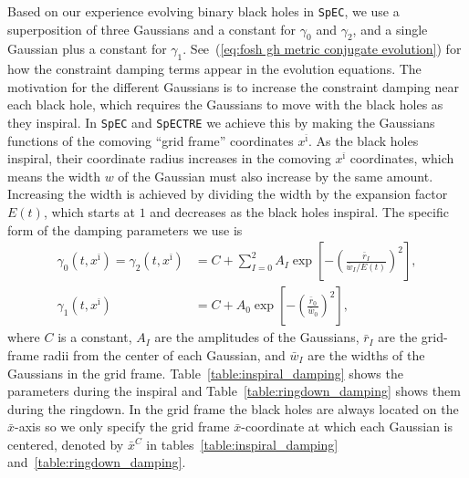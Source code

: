 \begin{bibunit}[unsrtnat]
Based on our experience evolving binary black holes in \texttt{SpEC}, we use a
superposition of three Gaussians and a constant for $\gamma_0$ and $\gamma_2$,
and a single Gaussian plus a constant for $\gamma_1$. See~(\ref{eq:fosh gh
  metric conjugate evolution}) for how the constraint damping terms appear in the
evolution equations. The motivation for the different Gaussians is to increase
the constraint damping near each black hole, which requires the Gaussians to
move with the black holes as they inspiral. In \texttt{SpEC} and
\texttt{SpECTRE} we achieve this by making the Gaussians functions of the
comoving ``grid frame'' coordinates $x^{\bar{\imath}}$. As the black holes
inspiral, their coordinate radius increases in the comoving $x^{\bar{\imath}}$
coordinates, which means the width $w$ of the Gaussian must also increase by the
same amount. Increasing the width is achieved by dividing the width by the
expansion factor $E(t)$, which starts at $1$ and decreases as the black holes
inspiral. The specific form of the damping parameters we use is
\begin{align}
  \label{eq:gamma_0_2_gaussian}
  \gamma_0(t, x^{\bar{\imath}})
  = \gamma_2(t, x^{\bar{\imath}}) &= C
      + \sum_{I=0}^2 A_I
      \exp\left[-\left(\frac{\bar{r}_I}{\bar{w}_I
      / E(t)}\right)^2\right],\\
  \label{eq:gamma_1_gaussian}
  \gamma_1(t, x^{\bar{\imath}})
  &= C + A_{0} \exp\left[-\left(\frac{\bar{r}_0}{\bar{w}_{0}}\right)^2\right],
\end{align}
where $C$ is a constant, $A_I$ are the amplitudes of the Gaussians, $\bar{r}_I$
are the grid-frame radii from the center of each Gaussian, and $\bar{w}_I$ are
the widths of the Gaussians in the grid
frame. Table~\ref{table:inspiral_damping} shows the parameters during the
inspiral and Table~\ref{table:ringdown_damping} shows them during the
ringdown. In the grid frame the black holes are always located on the
$\bar{x}$-axis so we only specify the grid frame $\bar{x}$-coordinate at which
each Gaussian is centered, denoted by $\bar{x}^C$ in
tables~\ref{table:inspiral_damping} and~\ref{table:ringdown_damping}.


\end{bibunit}
